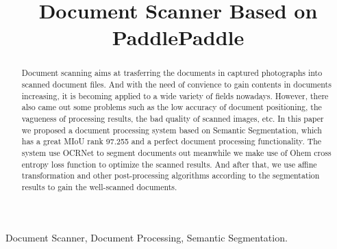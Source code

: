 \documentclass[10pt, conference, compsocconf]{IEEEtran}
\begin{document}
	\title{Document Scanner Based on PaddlePaddle}
	
	\author{
		}
	\maketitle
	\begin{abstract}
		
	Document scanning aims at trasferring the documents in captured photographs into scanned document files. 
	And with the need of convience to gain contents in documents increasing, it is becoming applied to a wide variety of fields nowadays. 
	However, there also came out some problems such as the low accuracy of document positioning, the vagueness of processing results, the bad quality of scanned images, etc. 
	In this paper we proposed a document processing system based on Semantic Segmentation, which has a great MIoU rank 97.255 and a perfect document processing functionality. 
	The system use OCRNet to segment documents out meanwhile we make use of Ohem cross entropy loss function to optimize the scanned results. 
	And after that, we use affine transformation and other post-processing algorithms according to the segmentation results to gain the well-scanned documents.
	\end{abstract}
	
	\begin{IEEEkeywords}
		
		Document Scanner, Document Processing, Semantic Segmentation.
		
	\end{IEEEkeywords}
	
	\IEEEpeerreviewmaketitle
	
\end{document}
